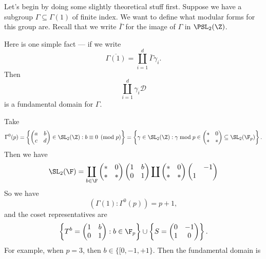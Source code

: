 \documentclass[a4paper]{article}
\begin{document}
Let's begin by doing some slightly theoretical stuff first. Suppose we have a subgroup $\Gamma \subseteq \Gamma(1)$ of finite index. We want to define what modular forms for this group are. Recall that we write $\bar{\Gamma}$ for the image of $\Gamma$ in $\PSL_2(\Z)$.

Here is one simple fact --- if we write
\[
  \overline{\Gamma(1)} = \coprod_{i = 1}^d \bar{\Gamma} \gamma_i.
\]
Then
\[
  \coprod_{i = 1}^d \gamma_i \mathcal{D}
\]
is a fundamental domain for $\Gamma$.

\begin{eg}
  Take
  \[
    \Gamma^0(p) = \left\{
      \begin{pmatrix}
        a & b\\
        c & d
      \end{pmatrix} \in \SL_2(\Z) : b \equiv 0 \pmod p
    \right\} = \left\{\gamma \in \SL_2(\Z): \gamma \bmod p \in
      \begin{pmatrix}
        * & 0\\
        * & *
      \end{pmatrix} \subseteq \SL_2(\F_p)
    \right\}.
  \]
  Then we have
  \[
    \SL_2(\F) = \coprod_{b \in \F}
    \begin{pmatrix}
      * & 0\\
      * & *
    \end{pmatrix}
    \begin{pmatrix}
      1 & b\\
      0 & 1
    \end{pmatrix}
    \coprod
    \begin{pmatrix}
      * & 0\\
      * & *
    \end{pmatrix}
    \begin{pmatrix}
      & -1\\
      1 &
    \end{pmatrix}
  \]
  So we have
  \[
    (\Gamma(1) : \Gamma^0(p)) = p + 1,
  \]
  and the coset representatives are
  \[
    \left\{
      T^b =
      \begin{pmatrix}
        1 & b\\
        0 & 1
      \end{pmatrix}
    : b \in \F_p\right\} \cup \left\{
      S =
      \begin{pmatrix}
        0 & -1\\
        1 & 0
      \end{pmatrix}
    \right\}.
  \]
  For example, when $p = 3$, then $b \in \{[0, -1, +1\}$. Then the fundamental domain is
  \begin{center}
    \begin{tikzpicture}


\end{tikzpicture}
\end{center}
\end{eg}
\end{document}
